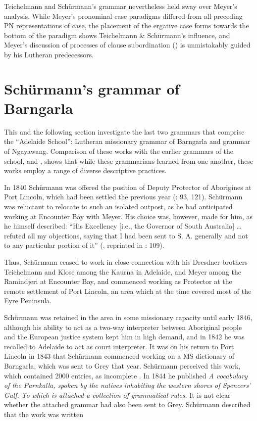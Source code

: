 Teichelmann and Schürmann’s grammar nevertheless held sway over Meyer’s analysis. While Meyer’s pronominal case paradigms differed from all preceding PN representations of case, the placement of the ergative case forms towards the bottom of the paradigm shows Teichelmann \& Schürmann’s influence, and Meyer’s discussion of processes of clause subordination () is unmistakably guided by his Lutheran predecessors.

\section{Schürmann’s grammar of Barngarla \citeyearpar{schurmann_letter_1844}}
\label{sec:key:6.2}\label{bkm:Ref73471921}\label{bkm:Ref74127491}\label{bkm:Ref73712365}

This and the following section investigate the last two grammars that comprise the ``Adelaide School'': Lutheran missionary  grammar of Barngarla and  grammar of Ngayawang. Comparison of these works with the earlier grammars of the school, \citet{teichelmann_outlines_1840} and \citet{meyer_vocabulary_1843}, shows that while these grammarians learned from one another, these works employ a range of diverse descriptive practices.

In 1840 Schürmann was offered the position of Deputy Protector of Aborigines at Port Lincoln, which had been settled the previous year (\citealt{Lockwood2014}: 93, 121). Schürmann was reluctant to relocate to such an isolated outpost, as he had anticipated working at Encounter Bay with Meyer. His choice was, however, made for him, as he himself described: “His Excellency [i.e., the Governor of South Australia] … refuted all my objections, saying that I had been sent to S. A. generally and not to any particular portion of it” (\citealt{schurmann_vocabulary_1844}, reprinted in \citealt{schurmann_id_1987}: 109).

Thus, Schürmann ceased to work in close connection with his Dresdner brothers Teichelmann and Klose among the Kaurna in Adelaide, and Meyer among the Ramindjeri at Encounter Bay, and commenced working as Protector at the remote settlement of Port Lincoln, an area which at the time covered most of the Eyre Peninsula.

Schürmann was retained in the area in some missionary capacity until early 1846, although his ability to act as a two-way interpreter between Aboriginal people and the European justice system kept him in high demand, and in 1842 he was recalled to Adelaide to act as court interpreter. It was on his return to Port Lincoln in 1843 that Schürmann commenced working on a MS dictionary of Barngarla, which was sent to Grey that year. Schürmann perceived this work, which contained 2000 entries, as incomplete \citep[77]{rathjen_difficult_1998}. In 1844 he published \textit{A vocabulary of the Parnkalla, spoken by the natives inhabiting the western shores of Spencers' Gulf. To which is attached a collection of grammatical rules.} It is not clear whether the attached grammar had also been sent to Grey. Schürmann described that the work was written

